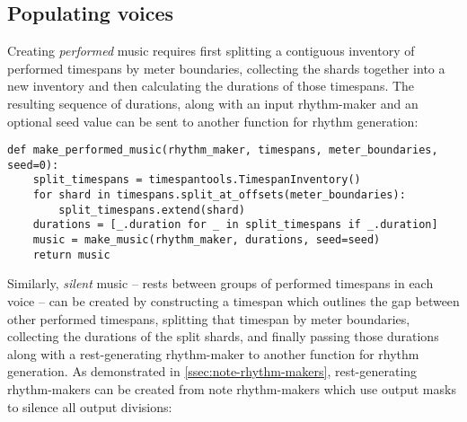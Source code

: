 \subsection{Populating voices}
\label{ssec:populating-voices}

Creating \emph{performed} music requires first splitting a contiguous inventory
of performed timespans by meter boundaries, collecting the shards together into
a new inventory and then calculating the durations of those timespans. The
resulting sequence of durations, along with an input rhythm-maker and an
optional seed value can be sent to another function for rhythm generation:

\begin{comment}
<abjadextract dissertation.py.time_tools:make_performed_music />[strip_prompt]
\end{comment}

\begin{abjadbookoutput}
\begin{singlespacing}
\vspace{-0.5\baselineskip}
\begin{lstlisting}
def make_performed_music(rhythm_maker, timespans, meter_boundaries, seed=0):
    split_timespans = timespantools.TimespanInventory()
    for shard in timespans.split_at_offsets(meter_boundaries):
        split_timespans.extend(shard)
    durations = [_.duration for _ in split_timespans if _.duration]
    music = make_music(rhythm_maker, durations, seed=seed)
    return music
\end{lstlisting}
\end{singlespacing}
\end{abjadbookoutput}

\noindent Similarly, \emph{silent} music -- rests between groups of performed
timespans in each voice -- can be created by constructing a timespan which
outlines the gap between other performed timespans, splitting that timespan by
meter boundaries, collecting the durations of the split shards, and finally
passing those durations along with a rest-generating rhythm-maker to another
function for rhythm generation. As demonstrated in
\autoref{ssec:note-rhythm-makers}, rest-generating rhythm-makers can be created
from note rhythm-makers which use output masks to silence all output divisions:

\begin{comment}
<abjadextract dissertation.py.time_tools:make_silent_music />[strip_prompt]
\end{comment}

